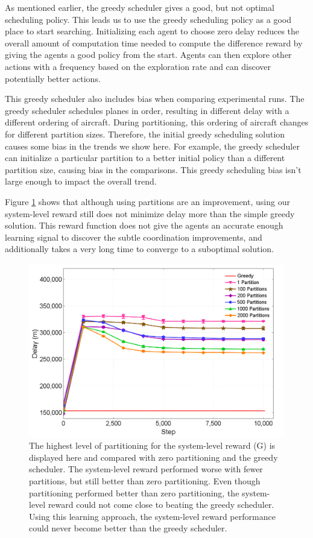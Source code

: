 \documentclass{aamas2014}
\begin{document}
As mentioned earlier, the greedy scheduler gives a good, but not optimal scheduling policy. This leads us to use the greedy scheduling policy as a good place to start searching. Initializing each agent to choose zero delay reduces the overall amount of computation time needed to compute the difference reward by giving the agents a good policy from the start. Agents can then explore other actions with a frequency based on the exploration rate and can discover potentially better actions.
  
This greedy scheduler also includes bias when comparing experimental runs. The greedy scheduler schedules planes in order, resulting in different delay with a different ordering of aircraft. During partitioning, this ordering of aircraft changes for different partition sizes. Therefore, the initial greedy scheduling solution causes some bias in the trends we show here. For example, the greedy scheduler can initialize a particular partition to a better initial policy than a different partition size, causing bias in the comparisons. This greedy scheduling bias isn't large enough to impact the overall trend.

Figure \ref{ClusterRewardsGreedyG} shows that although using partitions are an improvement, using our system-level reward still does not minimize delay more than the simple greedy solution. This reward function does not give the agents an accurate enough learning signal to discover the subtle coordination improvements, and additionally takes a very long time to converge to a suboptimal solution. 

\begin{figure}[]
\centering
\includegraphics[width=1.0\columnwidth]{ClusterRewardsGreedyG}
\caption{The highest level of partitioning for the system-level reward (G) is displayed here and compared with zero partitioning and the greedy scheduler. The system-level reward performed worse with fewer partitions, but still better than zero partitioning. Even though partitioning performed better than zero partitioning, the system-level reward could not come close to beating the greedy scheduler. Using this learning approach, the system-level reward performance could never become better than the greedy scheduler.}
\label{ClusterRewardsGreedyG}
\end{figure}
\end{document}
